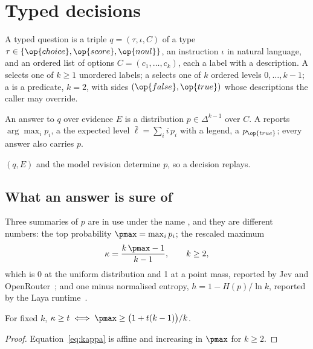 \section{Typed decisions}
\label{sec:decisions}

\begin{definition}
A typed question is a triple $q = (\tau, \iota, C)$ of a type
$\tau \in \{\op{choice}, \op{score}, \op{noul}\}$, an instruction $\iota$ in
natural language, and an ordered list of options
$C = (c_1, \dots, c_k)$, each a label with a description.
A  selects one of $k \ge 1$ unordered labels; a  selects
one of $k$ ordered levels $0, \dots, k-1$; a  is a predicate, $k = 2$,
with sides $(\op{false}, \op{true})$ whose descriptions the caller may
override.
\end{definition}

\begin{definition}[Answer]
An answer to $q$ over evidence $E$ is a distribution $p \in \Delta^{k-1}$ over
$C$. A  reports $\arg\max_i p_i$, a  the expected level
$\bar\ell = \sum_i i\, p_i$ with a legend, a  $p_{\op{true}}$; every
answer also carries $p$.
\end{definition}

$(q, E)$ and the model revision determine $p$, so a decision replays.

\subsection{What an answer is sure of}
\label{sec:confidence}

Three summaries of $p$ are in use under the name , and they are
different numbers: the top probability $\pmax = \max_i p_i$; the rescaled
maximum
\begin{equation}
  \kappa = \frac{k\,\pmax - 1}{k - 1}, \qquad k \ge 2,
  \label{eq:kappa}
\end{equation}
which is 0 at the uniform distribution and 1 at a point mass, reported by Jev
and OpenRouter~\cite{laya,openrouterdecisions}; and one minus normalised
entropy, $h = 1 - H(p)/\ln k$, reported by the Laya runtime~\cite{laya}.

\begin{proposition}
\label{prop:kappa}
For fixed $k$, $\kappa \ge t \iff \pmax \ge \bigl(1 + t(k-1)\bigr)/k$.
\end{proposition}
\begin{proof}
Equation~\eqref{eq:kappa} is affine and increasing in $\pmax$ for $k \ge 2$.
\end{proof}

